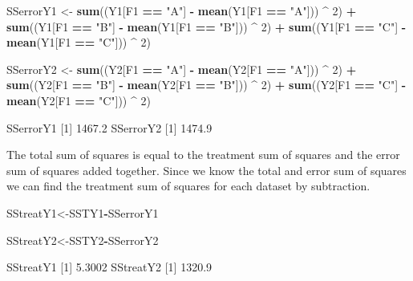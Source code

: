 \documentclass[
]{book}
\newenvironment{Shaded}{\begin{snugshade}}{\end{snugshade}}
\newcommand{\DecValTok}[1]{\textcolor[rgb]{0.00,0.00,0.81}{#1}}
\newcommand{\FloatTok}[1]{\textcolor[rgb]{0.00,0.00,0.81}{#1}}
\newcommand{\KeywordTok}[1]{\textcolor[rgb]{0.13,0.29,0.53}{\textbf{#1}}}
\newcommand{\NormalTok}[1]{#1}
\newcommand{\OperatorTok}[1]{\textcolor[rgb]{0.81,0.36,0.00}{\textbf{#1}}}
\newcommand{\StringTok}[1]{\textcolor[rgb]{0.31,0.60,0.02}{#1}}
\begin{document}
\begin{Shaded}
\begin{Highlighting}[]
\NormalTok{SSerrorY1 <-}
\StringTok{  }\KeywordTok{sum}\NormalTok{((Y1[F1 }\OperatorTok{==}\StringTok{ "A"}\NormalTok{] }\OperatorTok{-}\StringTok{ }\KeywordTok{mean}\NormalTok{(Y1[F1 }\OperatorTok{==}\StringTok{ "A"}\NormalTok{])) }\OperatorTok{^}\StringTok{ }\DecValTok{2}\NormalTok{) }\OperatorTok{+}
\StringTok{  }\KeywordTok{sum}\NormalTok{((Y1[F1 }\OperatorTok{==}\StringTok{ "B"}\NormalTok{] }\OperatorTok{-}\StringTok{ }\KeywordTok{mean}\NormalTok{(Y1[F1 }\OperatorTok{==}\StringTok{ "B"}\NormalTok{])) }\OperatorTok{^}\StringTok{ }\DecValTok{2}\NormalTok{) }\OperatorTok{+}
\StringTok{  }\KeywordTok{sum}\NormalTok{((Y1[F1 }\OperatorTok{==}\StringTok{ "C"}\NormalTok{] }\OperatorTok{-}\StringTok{ }\KeywordTok{mean}\NormalTok{(Y1[F1 }\OperatorTok{==}\StringTok{ "C"}\NormalTok{])) }\OperatorTok{^}\StringTok{ }\DecValTok{2}\NormalTok{)}
  

\NormalTok{SSerrorY2 <-}
\StringTok{  }\KeywordTok{sum}\NormalTok{((Y2[F1 }\OperatorTok{==}\StringTok{ "A"}\NormalTok{] }\OperatorTok{-}\StringTok{ }\KeywordTok{mean}\NormalTok{(Y2[F1 }\OperatorTok{==}\StringTok{ "A"}\NormalTok{])) }\OperatorTok{^}\StringTok{ }\DecValTok{2}\NormalTok{) }\OperatorTok{+}
\StringTok{  }\KeywordTok{sum}\NormalTok{((Y2[F1 }\OperatorTok{==}\StringTok{ "B"}\NormalTok{] }\OperatorTok{-}\StringTok{ }\KeywordTok{mean}\NormalTok{(Y2[F1 }\OperatorTok{==}\StringTok{ "B"}\NormalTok{])) }\OperatorTok{^}\StringTok{ }\DecValTok{2}\NormalTok{) }\OperatorTok{+}
\StringTok{  }\KeywordTok{sum}\NormalTok{((Y2[F1 }\OperatorTok{==}\StringTok{ "C"}\NormalTok{] }\OperatorTok{-}\StringTok{ }\KeywordTok{mean}\NormalTok{(Y2[F1 }\OperatorTok{==}\StringTok{ "C"}\NormalTok{])) }\OperatorTok{^}\StringTok{ }\DecValTok{2}\NormalTok{)}
    
\NormalTok{SSerrorY1}
\NormalTok{[}\DecValTok{1}\NormalTok{] }\FloatTok{1467.2}
\NormalTok{SSerrorY2}
\NormalTok{[}\DecValTok{1}\NormalTok{] }\FloatTok{1474.9}
\end{Highlighting}
\end{Shaded}

The total sum of squares is equal to the treatment sum of squares and the error sum of squares added together. Since we know the total and error sum of squares we can find the treatment sum of squares for each dataset by subtraction.

\begin{Shaded}
\begin{Highlighting}[]
\NormalTok{SStreatY1<-SSTY1}\OperatorTok{-}\NormalTok{SSerrorY1}

\NormalTok{SStreatY2<-SSTY2}\OperatorTok{-}\NormalTok{SSerrorY2}

\NormalTok{SStreatY1}
\NormalTok{[}\DecValTok{1}\NormalTok{] }\FloatTok{5.3002}
\NormalTok{SStreatY2}
\NormalTok{[}\DecValTok{1}\NormalTok{] }\FloatTok{1320.9}
\end{Highlighting}
\end{Shaded}
\end{document}
